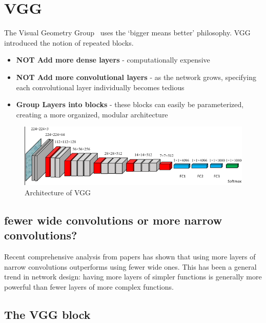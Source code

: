 \documentclass[11pt]{article}
\begin{document}


\section{VGG}

The Visual Geometry Group~\cite{VGG} uses the `bigger means better' philosophy. VGG introduced the notion of repeated blocks.

\begin{itemize}
    \item \textbf{NOT Add more dense layers} - computationally expensive
    \item \textbf{NOT Add more convolutional layers} - as the network grows, specifying each convolutional layer individually becomes tedious
    \item \textbf{Group Layers into blocks} - these blocks can easily be parameterized, creating a more organized, modular architecture
\end{itemize}

\begin{figure}[H]
    \centering
    \includegraphics[width=\linewidth]{figures/VGGFigure.png}
    \caption{Architecture of VGG}
\end{figure}



\subsection{fewer wide convolutions or more narrow convolutions?}

Recent comprehensive analysis from papers has shown that using more layers of narrow convolutions outperforms using fewer wide ones. This has been a general trend in network design: having more layers of simpler functions is generally more powerful than fewer layers of more complex functions. 

\subsection{The VGG block}
\end{document}
